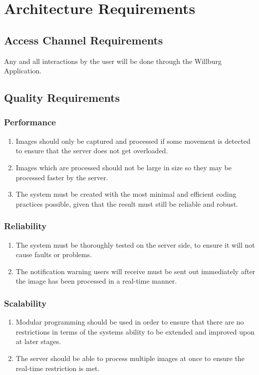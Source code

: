 \section{Architecture Requirements}
\subsection{Access Channel Requirements}
Any and all interactions by the user will be done through the Willburg Application.
\subsection{Quality Requirements}
\subsubsection{Performance}
\begin{enumerate}
	\item Images should only be captured and processed if some movement is detected to ensure that the server does not get overloaded.
	\item Images which are processed should not be large in size so they may be processed faster by the server.
	\item The system must be created with the most minimal and efficient coding
	practices possible, given that the result must still be reliable and robust.
\end{enumerate}
\subsubsection{Reliability}
\begin{enumerate}
	\item The system must be thoroughly tested on the server side, to
	ensure it will not cause faults or problems. 
	\item The notification warning users will receive must be sent out immediately after the image has been processed in a real-time manner.
\end{enumerate}
\subsubsection{Scalability}
\begin{enumerate}
	\item Modular programming should be used in order to ensure that there are no restrictions in terms of the systems ability to be extended and improved upon at later stages.
	\item The server should be able to process multiple images at once to ensure the real-time restriction is met.
\end{enumerate}
